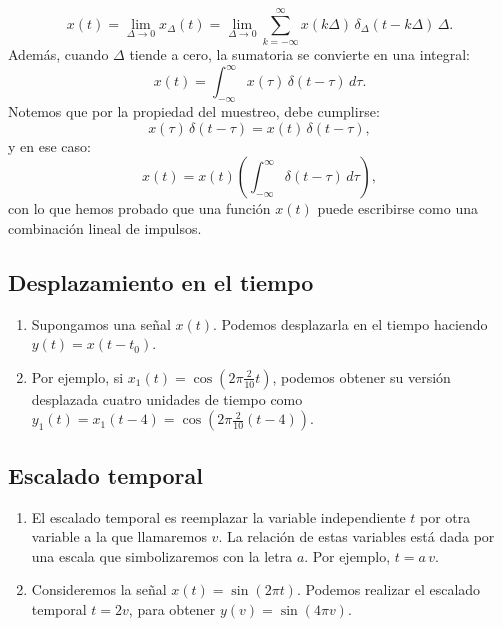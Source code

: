 \begin{equation}
	x(t) = \lim_{\Delta \to 0} x_{\Delta}(t) = \lim_{\Delta \to 0} \sum_{k=-\infty}^{\infty} x(k\Delta) \, \delta_{\Delta}(t-k\Delta) \, \Delta .
\end{equation}
Además, cuando $\Delta$ tiende a cero, la sumatoria se convierte en una integral:
\begin{equation}
	x(t) = \int_{-\infty}^{\infty} x(\tau) \, \delta(t-\tau) \, d\tau .
\end{equation}
Notemos que por la propiedad del muestreo, debe cumplirse:
\begin{equation}
	x(\tau) \, \delta(t-\tau) = x(t) \, \delta(t-\tau) ,
\end{equation}
y en ese caso:
\begin{equation}
	x(t) = x(t) \left( \int_{-\infty}^{\infty} \delta(t-\tau) \, d\tau \right),
\end{equation}
con lo que hemos probado que una función $x(t)$ puede escribirse
como una combinación lineal de impulsos.

\subsection{Desplazamiento en el tiempo}

\begin{enumerate}
	\item Supongamos una señal $x(t)$. Podemos desplazarla en el tiempo
	haciendo $y(t) = x(t - t_{0})$.
	\item Por ejemplo, si $x_{1}(t) = \cos(2\pi \frac{2}{10} t)$,
	podemos obtener su versión desplazada cuatro unidades de tiempo como
	$y_{1}(t) = x_{1}(t - 4) =  \cos(2\pi \frac{2}{10} (t - 4))$.
\end{enumerate}


\subsection{Escalado temporal}

\begin{enumerate}
	\item El escalado temporal es reemplazar la variable independiente $t$
	por otra variable a la que llamaremos $v$. La relación de estas
	variables está dada por una escala que simbolizaremos con la letra
	$a$. Por ejemplo, $t = a \, v$.
	
	\item Consideremos la señal $x(t) = \sin(2\pi t)$. Podemos
	realizar el escalado temporal $t = 2v$, para obtener $y(v) =
	\sin(4\pi v)$.
\end{enumerate}

